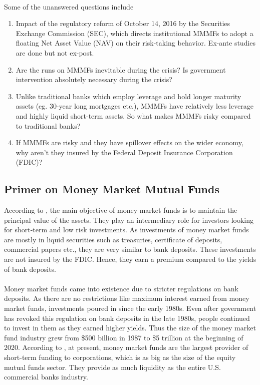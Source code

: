 \documentclass[11pt]{article}
\begin{document}
\paragraph{} Some of the unanswered questions include 
\begin{enumerate}
    \item Impact of the regulatory reform of October 14, 2016 by the Securities Exchange Commission (SEC), which directs institutional MMMFs to adopt a floating Net Asset Value (NAV) on their risk-taking behavior. Ex-ante studies are done but not ex-post.
    \item Are the runs on MMMFs inevitable during the crisis? Is government intervention absolutely necessary during the crisis? 
    \item Unlike traditional banks which employ leverage and hold longer maturity assets (eg. 30-year long mortgages etc.), MMMFs have relatively less leverage and highly liquid short-term assets. So what makes MMMFs risky compared to traditional banks? 
    \item If MMMFs are risky and they have spillover effects on the wider economy, why aren't they insured by the Federal Deposit Insurance Corporation (FDIC)?
\end{enumerate}

\subsection{Primer on Money Market Mutual Funds}

According to \cite{acharya2010regulating}, the main objective of money market funds is to maintain the principal value of the assets. They play an intermediary role for investors looking for short-term and low risk investments. As investments of money market funds are mostly in liquid securities such as treasuries, certificate of deposits, commercial papers etc., they are very similar to bank deposits. These investments are not insured by the FDIC. Hence, they earn a premium compared to the yields of bank deposits.

\paragraph{} Money market funds came into existence due to stricter regulations on bank deposits. As there are no restrictions like maximum interest earned from money market funds, investments poured in since the early 1980s. Even after government has revoked this regulation on bank deposits in the late 1980s, people continued to invest in them as they earned higher yields. Thus the size of the money market fund industry grew from \$500 billion in 1987 to \$5 trillion at the beginning of 2020. According to \cite{kacperczyk2013safe}, at present, money market funds are the largest provider of short-term funding to corporations, which is as big as the size of the equity mutual funds sector. They provide as much liquidity as the entire U.S. commercial banks industry.
\end{document}
